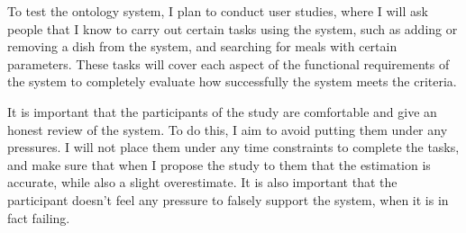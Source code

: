 To test the ontology system, I plan to conduct user studies, where I will ask people that I know to carry out certain tasks using the system, such as adding or removing a dish from the system, and searching for meals with certain parameters. These tasks will cover each aspect of the functional requirements of the system to completely evaluate how successfully the system meets the criteria.

It is important that the participants of the study are comfortable and give an honest review of the system. To do this, I aim to avoid putting them under any pressures. I will not place them under any time constraints to complete the tasks, and make sure that when I propose the study to them that the estimation is accurate, while also a slight overestimate. It is also important that the participant doesn't feel any pressure to falsely support the system, when it is in fact failing.


